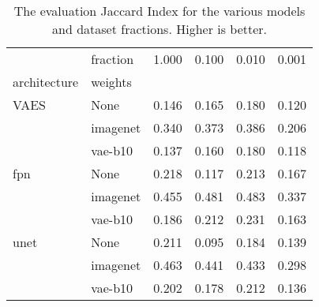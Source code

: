 \begin{table}[ht]
\centering
\caption{The evaluation Jaccard Index for the various models and dataset fractions. Higher is better.}
\label{tab:data_fraction_results}
\begin{tabular}{llrrrr}
\toprule
     & fraction &  1.000 &  0.100 &  0.010 &  0.001 \\
architecture & weights &        &        &        &        \\
\midrule
VAES & None &  0.146 &  0.165 &  0.180 &  0.120 \\
     & imagenet &  0.340 &  0.373 &  0.386 &  0.206 \\
     & vae-b10 &  0.137 &  0.160 &  0.180 &  0.118 \\
fpn & None &  0.218 &  0.117 &  0.213 &  0.167 \\
     & imagenet &  0.455 &  0.481 &  0.483 &  0.337 \\
     & vae-b10 &  0.186 &  0.212 &  0.231 &  0.163 \\
unet & None &  0.211 &  0.095 &  0.184 &  0.139 \\
     & imagenet &  0.463 &  0.441 &  0.433 &  0.298 \\
     & vae-b10 &  0.202 &  0.178 &  0.212 &  0.136 \\
\bottomrule
\end{tabular}
\end{table}
